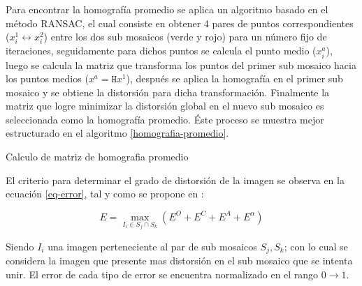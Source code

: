 Para encontrar la homografía promedio se aplica un algoritmo basado en el método RANSAC, el cual consiste en obtener 4 pares de puntos correspondientes ($x^1_i   \leftrightarrow x^2_i$) entre los dos sub mosaicos (verde y rojo) para un número fijo de iteraciones, seguidamente para dichos puntos se calcula el punto medio ($x^a_i$), luego se calcula la matriz que transforma los puntos del primer sub mosaico hacia los puntos medios ($x^a = \mathtt{H}x^1$), después se aplica la homografía en el primer sub mosaico y se obtiene la distorsión para dicha transformación. Finalmente la matriz que logre minimizar la distorsión global en el nuevo sub mosaico es seleccionada como la homografía promedio. Éste proceso se muestra mejor estructurado en el algoritmo \ref{homografia-promedio}.


\begin{spacing}{0.8}
	\begin{algorithm}[h] %
		\caption{Calculo de matriz de homografia promedio}
		\label{homografia-promedio}
		\SetAlgoLined
\end{algorithm}
\end{spacing}

El criterio para determinar el grado de distorsión de la imagen se observa en la ecuación \ref{eq-error}, tal y como se propone en \cite{bellavia-ref}:

\begin{equation}
E = \max\limits_{I_i\in S_j\cap S_k} (E^O + E^C + E^A + E^\alpha)
\label{eq-error}
\end{equation}


Siendo $I_i$ una imagen perteneciente al par de sub mosaicos $S_j,S_k$; con lo cual se considera la imagen que presente mas distorsión en el sub mosaico que se intenta unir. El error de cada tipo de error se encuentra normalizado en el rango $0\to 1$. 

